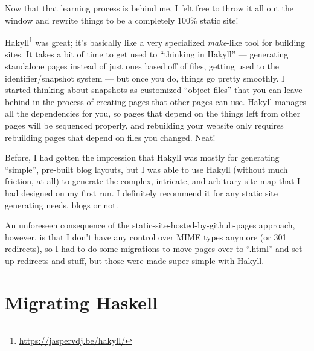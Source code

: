 \documentclass[]{article}
\renewcommand{\href}[2]{#2\footnote{\url{#1}}}
\begin{document}
Now that that learning process is behind me, I felt free to throw it all
out the window and rewrite things to be a completely 100\% static site!

\href{https://jaspervdj.be/hakyll/}{Hakyll} was great; it's basically
like a very specialized \emph{make}-like tool for building sites. It
takes a bit of time to get used to ``thinking in Hakyll'' --- generating
standalone pages instead of just ones based off of files, getting used
to the identifier/snapshot system --- but once you do, things go pretty
smoothly. I started thinking about snapshots as customized ``object
files'' that you can leave behind in the process of creating pages that
other pages can use. Hakyll manages all the dependencies for you, so
pages that depend on the things left from other pages will be sequenced
properly, and rebuilding your website only requires rebuilding pages
that depend on files you changed. Neat!

Before, I had gotten the impression that Hakyll was mostly for
generating ``simple'', pre-built blog layouts, but I was able to use
Hakyll (without much friction, at all) to generate the complex,
intricate, and arbitrary site map that I had designed on my first run. I
definitely recommend it for any static site generating needs, blogs or
not.

An unforeseen consequence of the static-site-hosted-by-github-pages
approach, however, is that I don't have any control over MIME types
anymore (or 301 redirects), so I had to do some migrations to move pages
over to ``.html'' and set up redirects and stuff, but those were made
super simple with Hakyll.

\section{Migrating Haskell}\label{migrating-haskell}
\end{document}
